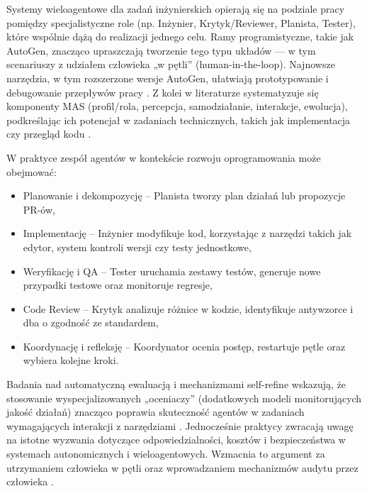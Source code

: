 Systemy wieloagentowe dla zadań inżynierskich opierają się na podziale pracy pomiędzy specjalistyczne role (np. Inżynier, Krytyk/Reviewer, Planista, Tester), które wspólnie dążą do realizacji jednego celu. Ramy programistyczne, takie jak AutoGen, znacząco upraszczają tworzenie tego typu układów — w tym scenariuszy z udziałem człowieka „w pętli” (human-in-the-loop). Najnowsze narzędzia, w tym rozszerzone wersje AutoGen, ułatwiają prototypowanie i debugowanie przepływów pracy \cite{autogen2023, autogenmsr2024}. Z kolei w literaturze systematyzuje się komponenty MAS (profil/rola, percepcja, samodziałanie, interakcje, ewolucja), podkreślając ich potencjał w zadaniach technicznych, takich jak implementacja czy przegląd kodu \cite{mas_survey_2024}.

W praktyce zespół agentów w kontekście rozwoju oprogramowania może obejmować:
\begin{itemize}
\item Planowanie i dekompozycję – Planista tworzy plan działań lub propozycje PR-ów,
\item Implementację – Inżynier modyfikuje kod, korzystając z narzędzi takich jak edytor, system kontroli wersji czy testy jednostkowe,
\item Weryfikację i QA – Tester uruchamia zestawy testów, generuje nowe przypadki testowe oraz monitoruje regresje,
\item Code Review – Krytyk analizuje różnice w kodzie, identyfikuje antywzorce i dba o zgodność ze standardem,
\item Koordynację i refleksję – Koordynator ocenia postęp, restartuje pętle oraz wybiera kolejne kroki.
\end{itemize}

Badania nad automatyczną ewaluacją i mechanizmami self-refine wskazują, że stosowanie wyspecjalizowanych „oceniaczy” (dodatkowych modeli monitorujących jakość działań) znacząco poprawia skuteczność agentów w zadaniach wymagających interakcji z narzędziami \cite{autoeval2024}. Jednocześnie praktycy zwracają uwagę na istotne wyzwania dotyczące odpowiedzialności, kosztów i bezpieczeństwa w systemach autonomicznych i wieloagentowych. Wzmacnia to argument za utrzymaniem człowieka w pętli oraz wprowadzaniem mechanizmów audytu przez człowieka \cite{wired_agents_liability_2025}.